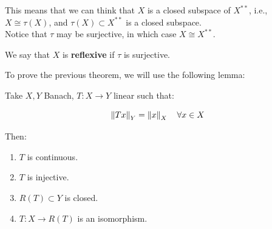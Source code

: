 \begin{fremark}
    This means that we can think that $X$ is a closed subspace of $X^{**}$,
    i.e., $X \cong \tau(X)$, and $\tau(X) \subset X^{**}$ is a closed subspace.\\

    Notice that $\tau$ may be surjective, in which case $X \cong X^{**}$.
\end{fremark}

\vspace{1em}

\begin{fdefinition}
    We say that $X$ is \textbf{reflexive} if $\tau$ is surjective.
\end{fdefinition}

\vspace{1em}

\begin{note}
    To prove the previous theorem, we will use the following lemma:
\end{note}

\begin{flemma}
    Take $X, Y$ Banach, $T: X \to Y$ linear such that:

    $$\left\|Tx\right\|_Y = \left\|x\right\|_X \quad \forall x \in X$$

    Then:
    \vspace{1em}
    \begin{enumerate}[label=(\roman*)]
        \item $T$ is continuous.
        \vspace{1em}
        \item $T$ is injective.
        \vspace{1em}
        \item $R(T) \subset Y$ is closed.
        \vspace{1em}
        \item $T: X \to R(T)$ is an isomorphism.
    \end{enumerate}
\end{flemma}

